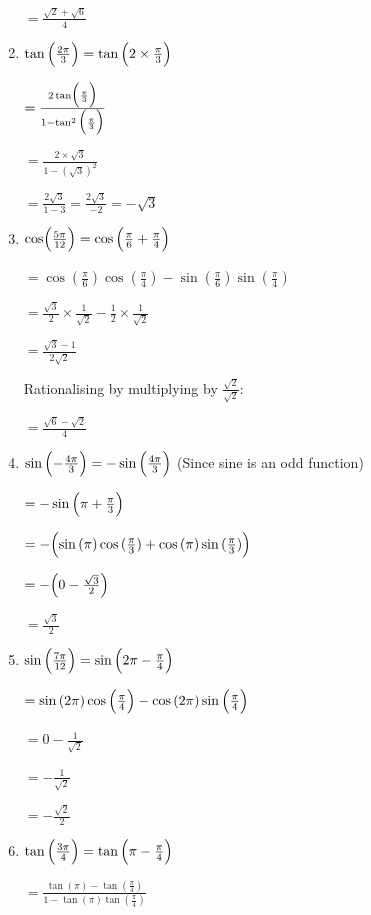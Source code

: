\documentclass[../main.tex]{subfiles}
\begin{document}
\begin{enumerate}[itemsep=0.4cm]
    $=\frac{\sqrt{2}+\sqrt{6}}{4}$

    \item 
    $\tan{\Bigl(\frac{2\pi}{3}\Bigr)}=\tan{\Bigl(2\times \frac{\pi}{3}\Bigr)}$

    $=\frac{2\tan\Bigl(\frac{\pi}{3}\Bigr)}{1-\tan^2{\Bigl(\frac{\pi}{3}\Bigr)}}$

    $=\frac{2\times \sqrt{3}}{1-(\sqrt{3})^2}$

    $=\frac{2\sqrt{3}}{1-3}=\frac{2\sqrt{3}}{-2}=-\sqrt{3}$

    \item 
    $\cos\Bigl(\frac{5\pi}{12}\Bigr)=\cos{\Bigl(\frac{\pi}{6}+\frac{\pi}{4}\Bigr)}$

    $=\cos{(\frac{\pi}{6})}\cos{(\frac{\pi}{4})}-\sin{(\frac{\pi}{6})}\sin{(\frac{\pi}{4})}$

    $=\frac{\sqrt{3}}{2}\times \frac{1}{\sqrt{2}}-\frac{1}{2}\times \frac{1}{\sqrt{2}}$

    $=\frac{\sqrt{3}-1}{2\sqrt{2}}$

    Rationalising by multiplying by $\frac{\sqrt{2}}{\sqrt{2}}$:

    $=\frac{\sqrt{6}-\sqrt{2}}{4}$

    \item 
    $\sin{\Bigl(-\frac{4\pi}{3}\Bigr)}=-\sin{\Bigl(\frac{4\pi}{3}\Bigr)}$
    (Since sine is an odd function)

    $=-\sin{\Bigl(\pi + \frac{\pi}{3}\Bigr)}$

    $=-\Bigl(\sin{(\pi)}\cos{(\frac{\pi}{3})}+\cos{(\pi)}\sin{(\frac{\pi}{3})}\Bigr)$

    $=-\Bigl(0-\frac{\sqrt{3}}{2}\Bigr)$

    $=\frac{\sqrt{3}}{2}$

    \item 
    $\sin{\Bigl(\frac{7\pi}{12}\Bigr)}=\sin{\Bigl(2\pi-\frac{\pi}{4}\Bigr)}$

    $=\sin{(2\pi)}\cos{\Bigl(\frac{\pi}{4}\Bigr)}-\cos{(2\pi)}\sin{\Bigl(\frac{\pi}{4}\Bigr)}$

    $=0-\frac{1}{\sqrt{2}}$

    $=-\frac{1}{\sqrt{2}}$

    $=-\frac{\sqrt{2}}{2}$

    \item 
    $\tan{\Bigl(\frac{3\pi}{4}\Bigr)}=\tan{\Bigl(\pi-\frac{\pi}{4}\Bigr)}$

    $=\frac{\tan{(\pi)}-\tan{(\frac{\pi}{4})}}{1-\tan{(\pi)}\tan{(\frac{\pi}{4})}}$


\end{enumerate}
\end{document}
